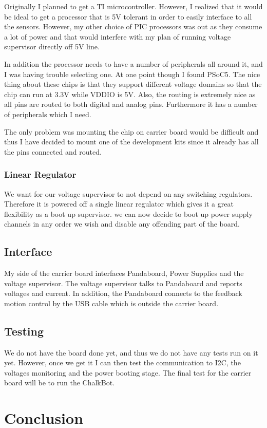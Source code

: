 \documentclass[12pt]{article}
\begin{document}
Originally I planned to get a TI microcontroller. However, I realized that it would be ideal to get a processor that is 5V tolerant in order to easily interface to all the sensors. However, my other choice of PIC processors was out as they consume a lot of power and that would interfere with my plan of running voltage supervisor directly off 5V line. 

In addition the processor needs to have a number of peripherals all around it, and I was having trouble selecting one. At one point though I found PSoC5. The nice thing about these chips is that they support different voltage domains so that the chip can run at 3.3V while VDDIO is 5V. Also, the routing is extremely nice as all pins are routed to both digital and analog pins.  Furthermore it has a number of peripherals which I need.

The only problem was mounting the chip on carrier board would be difficult and thus I have decided to mount one of the development kits since it already has all the pins connected and routed. 
\subsubsection{Linear Regulator}
We want for our voltage supervisor to not depend on any switching regulators. Therefore it is powered off a single linear regulator which gives it a great flexibility as a boot up supervisor. we can now decide to boot up power supply channels in any order we wish and disable any offending part of the board.
\subsection{Interface}
My side of the carrier board interfaces Pandaboard, Power Supplies and the voltage supervisor. The voltage supervisor talks to Pandaboard and reports voltages and current. In addition, the Pandaboard connects to the feedback motion control by the USB cable which is outside the carrier board.
\subsection{Testing}
We do not have the board done yet, and thus we do not have any tests run on it yet. However, once we get it I can then test the communication to I2C, the voltages monitoring and the power booting stage. The final test for the carrier board will be to run the ChalkBot.
\section{Conclusion}
\end{document}
